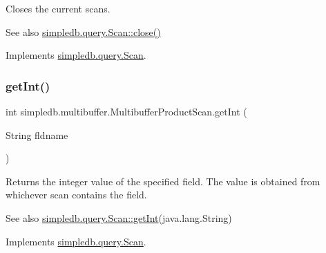 Closes the current scans. \begin{DoxySeeAlso}{See also}
\hyperlink{interfacesimpledb_1_1query_1_1Scan_a260f40a8c82edaa00398bea9d698933c}{simpledb.\+query.\+Scan\+::close()} 
\end{DoxySeeAlso}


Implements \hyperlink{interfacesimpledb_1_1query_1_1Scan_a260f40a8c82edaa00398bea9d698933c}{simpledb.\+query.\+Scan}.

\mbox{\label{classsimpledb_1_1multibuffer_1_1MultibufferProductScan_ab41a5fafcf3d1af5b9657e83b1d734c2}} 
\subsubsection{\texorpdfstring{get\+Int()}{getInt()}}
{\footnotesize\ttfamily int simpledb.\+multibuffer.\+Multibuffer\+Product\+Scan.\+get\+Int (\begin{DoxyParamCaption}\item[{String}]{fldname }\end{DoxyParamCaption})\hspace{0.3cm}{\ttfamily [inline]}}

Returns the integer value of the specified field. The value is obtained from whichever scan contains the field. \begin{DoxySeeAlso}{See also}
\hyperlink{interfacesimpledb_1_1query_1_1Scan_a2e064555e16240115167b5d42d2b3d19}{simpledb.\+query.\+Scan\+::get\+Int}(java.\+lang.\+String) 
\end{DoxySeeAlso}


Implements \hyperlink{interfacesimpledb_1_1query_1_1Scan_a2e064555e16240115167b5d42d2b3d19}{simpledb.\+query.\+Scan}.

\mbox{\label{classsimpledb_1_1multibuffer_1_1MultibufferProductScan_ad79341706c7a797ec6d56dc7c04b9276}} 
